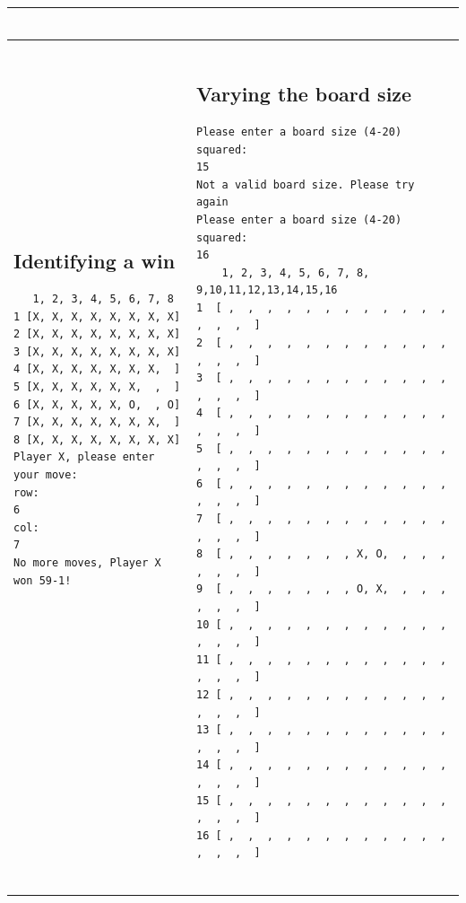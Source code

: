 \documentclass[a4wide, 11pt]{article}
\begin{document}
\begin{center}
\begin{tabular}{ | l | l |}
\begin{minipage}{85mm}
\begin{scriptsize}
\begin{verbatim}
          \end{verbatim}
        \end{scriptsize}
      \end{minipage}
      \\
      \hline
      \begin{minipage}{85mm}
      \tiny{\begin{verbatim} \end{verbatim}}
      \subsection{Identifying a win}
        \begin{scriptsize}
          \begin{verbatim}
   1, 2, 3, 4, 5, 6, 7, 8 
1 [X, X, X, X, X, X, X, X]
2 [X, X, X, X, X, X, X, X]
3 [X, X, X, X, X, X, X, X]
4 [X, X, X, X, X, X, X,  ]
5 [X, X, X, X, X, X,  ,  ]
6 [X, X, X, X, X, O,  , O]
7 [X, X, X, X, X, X, X,  ]
8 [X, X, X, X, X, X, X, X]
Player X, please enter your move:
row: 
6
col: 
7
No more moves, Player X won 59-1!








          \end{verbatim}
        \end{scriptsize}
      \end{minipage}
      &
      \begin{minipage}{85mm}
      \tiny{\begin{verbatim} \end{verbatim}}
      \subsection{Varying the board size}
        \begin{scriptsize}
          \begin{verbatim}
Please enter a board size (4-20) squared:
15
Not a valid board size. Please try again
Please enter a board size (4-20) squared:
16      
    1, 2, 3, 4, 5, 6, 7, 8, 9,10,11,12,13,14,15,16 
1  [ ,  ,  ,  ,  ,  ,  ,  ,  ,  ,  ,  ,  ,  ,  ,  ]
2  [ ,  ,  ,  ,  ,  ,  ,  ,  ,  ,  ,  ,  ,  ,  ,  ]
3  [ ,  ,  ,  ,  ,  ,  ,  ,  ,  ,  ,  ,  ,  ,  ,  ]
4  [ ,  ,  ,  ,  ,  ,  ,  ,  ,  ,  ,  ,  ,  ,  ,  ]
5  [ ,  ,  ,  ,  ,  ,  ,  ,  ,  ,  ,  ,  ,  ,  ,  ]
6  [ ,  ,  ,  ,  ,  ,  ,  ,  ,  ,  ,  ,  ,  ,  ,  ]
7  [ ,  ,  ,  ,  ,  ,  ,  ,  ,  ,  ,  ,  ,  ,  ,  ]
8  [ ,  ,  ,  ,  ,  ,  , X, O,  ,  ,  ,  ,  ,  ,  ]
9  [ ,  ,  ,  ,  ,  ,  , O, X,  ,  ,  ,  ,  ,  ,  ]
10 [ ,  ,  ,  ,  ,  ,  ,  ,  ,  ,  ,  ,  ,  ,  ,  ]
11 [ ,  ,  ,  ,  ,  ,  ,  ,  ,  ,  ,  ,  ,  ,  ,  ]
12 [ ,  ,  ,  ,  ,  ,  ,  ,  ,  ,  ,  ,  ,  ,  ,  ]
13 [ ,  ,  ,  ,  ,  ,  ,  ,  ,  ,  ,  ,  ,  ,  ,  ]
14 [ ,  ,  ,  ,  ,  ,  ,  ,  ,  ,  ,  ,  ,  ,  ,  ]
15 [ ,  ,  ,  ,  ,  ,  ,  ,  ,  ,  ,  ,  ,  ,  ,  ]
16 [ ,  ,  ,  ,  ,  ,  ,  ,  ,  ,  ,  ,  ,  ,  ,  ]


\end{verbatim}
\end{scriptsize}
\end{minipage}
\end{tabular}
\end{center}
\end{document}
